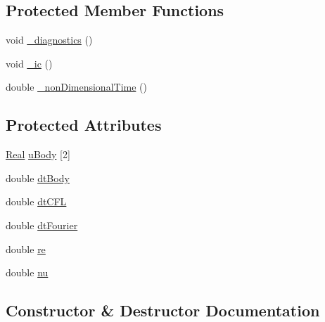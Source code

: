 \subsection*{Protected Member Functions}
\begin{DoxyCompactItemize}
\item 
void \hyperlink{class_sim___f_s_i___moving_aa858863674a7bffcdbaddb3aadd2f68d}{\+\_\+diagnostics} ()
\item 
void \hyperlink{class_sim___f_s_i___moving_a45d9af44039a61a6a4164f90869edd27}{\+\_\+ic} ()
\item 
double \hyperlink{class_sim___f_s_i___moving_a2afeea28eff7119bfa2efcf4afc381eb}{\+\_\+non\+Dimensional\+Time} ()
\end{DoxyCompactItemize}
\subsection*{Protected Attributes}
\begin{DoxyCompactItemize}
\item 
\hyperlink{_h_d_f5_dumper_8h_a445a5f0e2a34c9d97d69a3c2d1957907}{Real} \hyperlink{class_sim___f_s_i___moving_a0375337ef732a1485729637ca0c34057}{u\+Body} \mbox{[}2\mbox{]}
\item 
double \hyperlink{class_sim___f_s_i___moving_a0afe565eb23a49fd97956ff02f0b755a}{dt\+Body}
\item 
double \hyperlink{class_sim___f_s_i___moving_ad34f9f64be650bf2c8f4d210042eef1e}{dt\+C\+F\+L}
\item 
double \hyperlink{class_sim___f_s_i___moving_a57d504bdcd3b8b47a0aea90163e16755}{dt\+Fourier}
\item 
double \hyperlink{class_sim___f_s_i___moving_aa6ae4bc61dc72dc2c32f8eb7392f801b}{re}
\item 
double \hyperlink{class_sim___f_s_i___moving_a396928da796eb14de27ca80c73152737}{nu}
\end{DoxyCompactItemize}


\subsection{Constructor \& Destructor Documentation}
\hypertarget{class_sim___f_s_i___moving_a6bf59570d685a1bb99517fb4a1aa010e}{}
